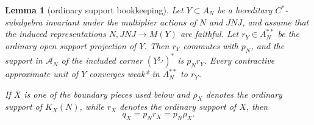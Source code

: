 \documentclass[12pt]{article}
\newtheorem{lemma}{Lemma}
\newcommand{\cA}{\mathcal A}
\begin{document}
\begin{lemma}[ordinary support bookkeeping]\label{lem:support}
Let \(Y\subset A_N\) be a hereditary \(C^*\)-subalgebra invariant under the
multiplier actions of \(N\) and \(JNJ\), and assume that the induced
representations \(N,JNJ\to M(Y)\) are faithful.  Let \(r_Y\in A_N^{**}\) be
the ordinary open support projection of \(Y\).  Then \(r_Y\) commutes with
\(p_N\), and the support in \(\cA_N\) of the included corner
\((Y^{\sharp_J})^*\) is \(p_Nr_Y\).  Every contractive approximate unit of
\(Y\) converges weak* in \(A_N^{**}\) to \(r_Y\).

If \(X\) is one of the boundary pieces used below and \(\rho_X\) denotes the
ordinary support of \(K_X(N)\), while \(r_X\) denotes the ordinary support of
\(X\), then
\[
        q_X=p_Nr_X=p_N\rho_X .                                    \tag{2}
\]
\end{lemma}
\end{document}
